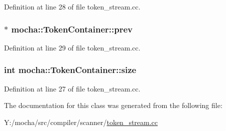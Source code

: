 Definition at line 28 of file token\_\-stream.cc.

\hypertarget{classmocha_1_1_token_container_a77a2a71f8311b6ab976c926794eaed68}{
\subsubsection[{prev}]{$\ast$ {\bf mocha::TokenContainer::prev}}}
\label{classmocha_1_1_token_container_a77a2a71f8311b6ab976c926794eaed68}


Definition at line 29 of file token\_\-stream.cc.

\hypertarget{classmocha_1_1_token_container_a5b6cd648b910921d15a12a01f189f369}{
\subsubsection[{size}]{\setlength{\rightskip}{0pt plus 5cm}int {\bf mocha::TokenContainer::size}}}
\label{classmocha_1_1_token_container_a5b6cd648b910921d15a12a01f189f369}


Definition at line 27 of file token\_\-stream.cc.



The documentation for this class was generated from the following file:\begin{DoxyCompactItemize}
\item 
Y:/mocha/src/compiler/scanner/\hyperlink{token__stream_8cc}{token\_\-stream.cc}\end{DoxyCompactItemize}
